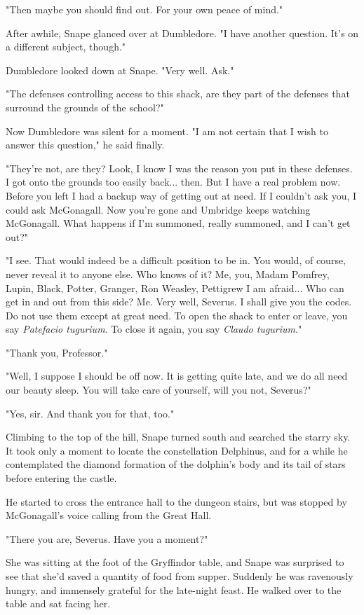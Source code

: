"Then maybe you should find out. For your own peace of mind."

After awhile, Snape glanced over at Dumbledore. "I have another question. It's on a different subject, though."

Dumbledore looked down at Snape. "Very well. Ask."

"The defenses controlling access to this shack, are they part of the defenses that surround the grounds of the school?"

Now Dumbledore was silent for a moment. "I am not certain that I wish to answer this question," he said finally.

"They're not, are they? Look, I know I was the reason you put in these defenses. I got onto the grounds too easily back... then. But I have a real problem now. Before you left I had a backup way of getting out at need. If I couldn't ask you, I could ask McGonagall. Now you're gone and Umbridge keeps watching McGonagall. What happens if I'm summoned, really summoned, and I can't get out?"

"I see. That would indeed be a difficult position to be in. You would, of course, never reveal it to anyone else. Who knows of it? Me, you, Madam Pomfrey, Lupin, Black, Potter, Granger, Ron Weasley, Pettigrew I am afraid... Who can get in and out from this side? Me. Very well, Severus. I shall give you the codes. Do not use them except at great need. To open the shack to enter or leave, you say \emph{Patefacio tugurium}. To close it again, you say \emph{Claudo tugurium}."

"Thank you, Professor."

"Well, I suppose I should be off now. It is getting quite late, and we do all need our beauty sleep. You will take care of yourself, will you not, Severus?"

"Yes, sir. And thank you for that, too."

Climbing to the top of the hill, Snape turned south and searched the starry sky. It took only a moment to locate the constellation Delphinus, and for a while he contemplated the diamond formation of the dolphin's body and its tail of stars before entering the castle.

He started to cross the entrance hall to the dungeon stairs, but was stopped by McGonagall's voice calling from the Great Hall.

"There you are, Severus. Have you a moment?"

She was sitting at the foot of the Gryffindor table, and Snape was surprised to see that she'd saved a quantity of food from supper. Suddenly he was ravenously hungry, and immensely grateful for the late-night feast. He walked over to the table and sat facing her.

